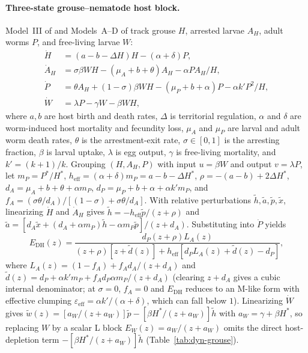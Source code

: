 \paragraph{Three-state grouse--nematode host block.}
Model~III of \citet{dobson1992} and Models~A--D of \citet{gaba2008} track grouse $H$, arrested larvae $A_H$, adult worms $P$, and free-living larvae $W$:
\begin{equation}\label{eq:dyn-dh-odes}
\begin{aligned}
\dot{H} &= (a - b - \Delta H)H - (\alpha + \delta)P, \\
\dot{A}_H &= \sigma\beta WH - (\mu_A + b + \theta)A_H - \alpha PA_H/H, \\
\dot{P} &= \theta A_H + (1 - \sigma)\beta WH - (\mu_P + b + \alpha)P - \alpha k' P^2/H, \\
\dot{W} &= \lambda P - \gamma W - \beta WH,
\end{aligned}
\end{equation}
where $a, b$ are host birth and death rates, $\Delta$ is territorial regulation, $\alpha$ and $\delta$ are worm-induced host mortality and fecundity loss, $\mu_A$ and $\mu_P$ are larval and adult worm death rates, $\theta$ is the arrestment-exit rate, $\sigma \in [0, 1]$ is the arresting fraction, $\beta$ is larval uptake, $\lambda$ is egg output, $\gamma$ is free-living mortality, and $k' = (k + 1)/k$. Grouping $(H, A_H, P)$ with input $u = \beta W$ and output $v = \lambda P$, let $m_P = P^*/H^*$, $h_{\mathrm{eff}} = (\alpha + \delta)m_P = a - b - \Delta H^*$, $\rho = -(a - b) + 2\Delta H^*$, $d_A = \mu_A + b + \theta + \alpha m_P$, $d_P = \mu_P + b + \alpha + \alpha k' m_P$, and $f_A = (\sigma\theta/d_A)/[(1 - \sigma) + \sigma\theta/d_A]$. With relative perturbations $\widetilde{h}, \widetilde{a}, \widetilde{p}, \widetilde{x}$, linearizing $\dot{H}$ and $\dot{A}_H$ gives $\widetilde{h} = -h_{\mathrm{eff}}\widetilde{p}/(z + \rho)$ and $\widetilde{a} = [d_A\widetilde{x} + (d_A + \alpha m_P)\widetilde{h} - \alpha m_P\widetilde{p}]/(z + d_A)$. Substituting into $\dot{P}$ yields
\begin{equation}\label{eq:dyn-dh-resp}
E_{\mathrm{DH}}(z) = \frac{d_P(z + \rho)L_A(z)}{(z + \rho)[z + \widetilde{d}(z)] + h_{\mathrm{eff}}[d_P L_A(z) + \widetilde{d}(z) - d_P]},
\end{equation}
where $L_A(z) = (1 - f_A) + f_A d_A/(z + d_A)$ and $\widetilde{d}(z) = d_P + \alpha k' m_P + f_A d_P \alpha m_P/(z + d_A)$ (clearing $z + d_A$ gives a cubic internal denominator; at $\sigma = 0$, $f_A = 0$ and $E_{\mathrm{DH}}$ reduces to an M-like form with effective clumping $\varepsilon_{\mathrm{eff}} = \alpha k'/(\alpha + \delta)$, which can fall below $1$). Linearizing $\dot{W}$ gives $\widetilde{w}(z) = [a_W/(z + a_W)]\widetilde{p} - [\beta H^*/(z + a_W)]\widetilde{h}$ with $a_W = \gamma + \beta H^*$, so replacing $W$ by a scalar L block $E_W(z) = a_W/(z + a_W)$ omits the direct host-depletion term $-[\beta H^*/(z + a_W)]\widetilde{h}$ (Table~\ref{tab:dyn-grouse}).

